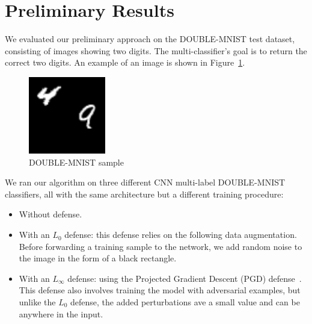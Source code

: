 
\section{Preliminary Results}
We evaluated our preliminary approach on the DOUBLE-MNIST test dataset, consisting of images showing two digits. The multi-classifier's goal is to return the correct two digits. %
An example of an image is shown in Figure~\ref{fig:double-mnist-sample}. %
\begin{figure}
    \centering
    \includegraphics[width=0.3\textwidth]{3.png}
    \caption{DOUBLE-MNIST sample}
    \label{fig:double-mnist-sample}
\end{figure}
We ran our algorithm on three different CNN multi-label DOUBLE-MNIST classifiers, all with the same architecture but a different training procedure:
\begin{itemize}
    \item Without defense. %
      \item With an $L_0$ defense: this defense relies on the following data augmentation.
    Before forwarding a training sample to the network, we add random noise to the image in the form of a black rectangle.
        \item With an $L_{\infty}$ defense: using the Projected Gradient Descent (PGD) defense~\cite{PGD}.
    This defense also involves training the model with adversarial examples, but unlike the $L_0$ defense, the added perturbations ave a small value and can be anywhere in the input.
\end{itemize} 

